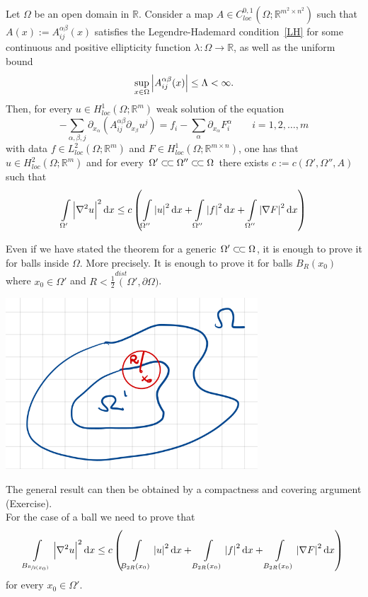 \begin{thm}[\(H^{2}\)-regularity]
    Let \( \Omega  \) be an open domain in \( \mathbb{R} \). Consider a map \( A\in C_{loc}^{0,1}(\Omega ; \mathbb{R}^{m^{2}\times n^{2}})  \)
    such that \( A(x) := A_{ij}^{\alpha \beta }(x)\) satisfies the Legendre-Hademard condition~\eqref{LH} for some continuous and positive ellipticity function \( \lambda : \Omega \to \mathbb{R}\),
    as well as the uniform bound
    \[ \sup_{x \in \Omega } \abs{A_{ij}^{\alpha \beta }(x)}\leq \Lambda < \infty. \] Then,
    for every \( u \in H_{loc}^{1}(\Omega ; \mathbb{R}^{m})  \) weak solution of the equation \[ - \sum\limits_{\alpha ,\beta ,j}^{}\partial_{x_{\alpha }}(A_{ij}^{\alpha \beta }\partial_{x_{\beta}}u^{j}) = f_{i}-\sum\limits_{\alpha}^{} \partial_{x_{\alpha }}F_{i}^{\alpha } \qquad i=1,2,\ldots,m  \]
    with data \( f \in L_{loc}^{2}(\Omega ;\mathbb{R}^{m}) \) and \( F \in H_{loc}^{1}(\Omega ;\mathbb{R}^{m \times n})  \), one  has that \( u \in H_{loc}^{2}(\Omega ; \mathbb{R}^{m})  \) and for every \( \Omega' \ssubset \Omega'' \ssubset \Omega \) there exists \( c:=c(\Omega', \Omega'', A)  \) such that
    \[ \int\limits_{\Omega'}^{} \abs{\nabla ^{2}u}^{2} \dd{x} \leq c \left( \int\limits_{\Omega''}^{} \abs{u}^{2} \dd{x} + \int\limits_{\Omega''}^{} \abs{f}^{2} \dd{x} + \int\limits_{\Omega''}^{} \abs{\nabla F}^{2} \dd{x} \right) \]
\end{thm}

\begin{remark}[]
    Even if we have stated the theorem for a generic \( \Omega' \ssubset \Omega  \), it is enough to prove it for balls inside \( \Omega  \).
    More precisely. It is enough to prove it for balls \( B_{R}(x_{0}) \) where \( x_{0}\in \Omega' \) and \( R < \frac{1}{2}\overset{dist}(\Omega', \partial \Omega )  \).
    \begin{center}
        \includegraphics[scale=0.45]{pictures/picture02.png}
    \end{center}
    The general result can then be obtained by a compactness and covering argument (Exercise).\\
    For the case of a ball we need to prove that
    \[ \int\limits_{B_{\sfrac{R}{2}(x_{0}) }}^{} \abs{\nabla ^{2}u}^{2} \dd{x} \leq c \left( \int\limits_{B_{2R}(x_{0})}^{} \abs{u}^{2} \dd{x} + \int\limits_{B_{2R}(x_{0})}^{} \abs{f}^{2} \dd{x} + \int\limits_{B_{2R}(x_{0})}^{} \abs{\nabla F}^{2} \dd{x} \right) \] for every \( x_{0} \in \Omega' \).
\end{remark}